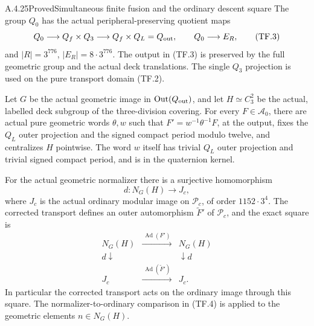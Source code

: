 \begin{result}{A.4.25}{Proved}{Simultaneous finite fusion and the ordinary descent square}
\label{thm:finite-transport-fusion}
The group \(Q_0\) has the actual peripheral-preserving
quotient maps
\[
 Q_0\longrightarrow Q_f\times Q_3
        \longrightarrow Q_f\times Q_L=Q_{\rm out},
 \qquad Q_0\longrightarrow E_R,
 \tag{TF.3}
\]
and \(|R|=3^{776}\), \(|E_R|=8\cdot3^{776}\).
The output in (TF.3) is preserved by the full geometric
group and the actual deck translations. The single \(Q_3\)
projection is used on the pure transport domain (TF.2).

Let \(G\) be the actual geometric image in
\(\operatorname{Out}(Q_{\rm out})\), and let
\(H\simeq C_3^2\) be the actual, labelled deck subgroup
of the three-division covering. For every \(F\in\mathcal A_0\),
there are actual pure geometric words \(\theta,w\) such that
\(F'=w^{-1}\theta^{-1}F\), at the output, fixes the
\(Q_L\) outer projection and the signed compact period
modulo twelve, and centralizes \(H\) pointwise. The word
\(w\) itself has trivial \(Q_L\) outer projection and
trivial signed compact period, and is in the quaternion kernel.

For the actual geometric normalizer there is a surjective
homomorphism
\[
        d:N_G(H)\longrightarrow J_c,
 \tag{TF.4}
\]
where \(J_c\) is the actual ordinary modular image on
\(\mathcal P_c\), of order \(1152\cdot3^4\).
The corrected transport defines an outer automorphism
\(\widetilde F'\) of \(\mathcal P_c\), and the exact square is
\[
 \begin{array}{ccc}
 N_G(H)&\xrightarrow{\ \operatorname{Ad}(F')\ }&N_G(H)\\
 d\downarrow&&\downarrow d\\
 J_c&\xrightarrow{\ \operatorname{Ad}(\widetilde F')\ }&J_c.
 \end{array}
 \tag{TF.5}
\]
In particular the corrected transport acts on the ordinary
image through this square. The normalizer-to-ordinary comparison
in (TF.4) is applied to the geometric elements \(n\in N_G(H)\).
\end{result}

